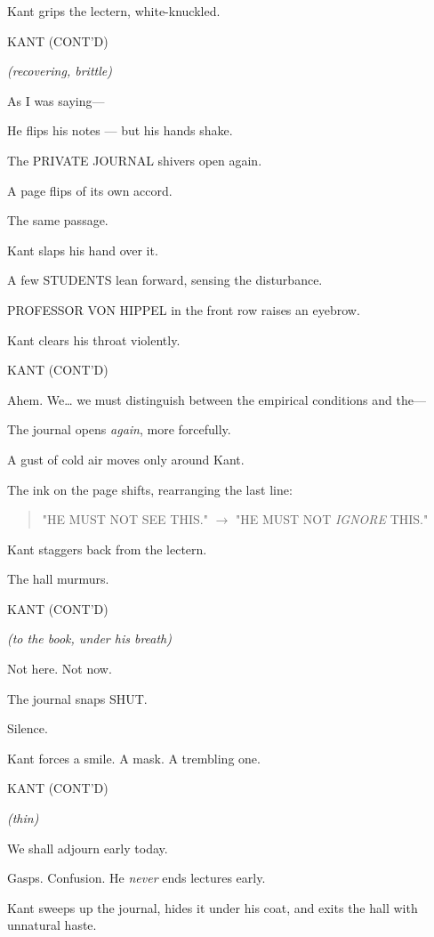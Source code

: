 \documentclass[12pt]{article}
\newenvironment{dialogue}[1]{%
  \vspace{0.8\baselineskip}%
  \noindent\hspace*{2.3in}\textsc{#1}\par%
  \noindent\hspace*{1.5in}\begin{minipage}[t]{4.5in}%
}{%
  \end{minipage}\par%
}
\newcommand{\paren}[1]{%
  \noindent\hspace*{1.8in}\textit{(#1)}\par%
}
\begin{document}
Kant grips the lectern, white-knuckled.

\begin{dialogue}{KANT (CONT'D)}
\paren{recovering, brittle}
As I was saying—
\end{dialogue}

He flips his notes — but his hands shake.

The PRIVATE JOURNAL shivers open again.

A page flips of its own accord.

The same passage.

Kant slaps his hand over it.

A few STUDENTS lean forward, sensing the disturbance.

PROFESSOR VON HIPPEL in the front row raises an eyebrow.

Kant clears his throat violently.

\begin{dialogue}{KANT (CONT'D)}
Ahem.
We… we must distinguish between the empirical conditions and the—
\end{dialogue}

The journal opens \emph{again}, more forcefully.

A gust of cold air moves only around Kant.

The ink on the page shifts, rearranging the last line:

\begin{quote}
"HE MUST NOT SEE THIS."
$\rightarrow$
"HE MUST NOT \emph{IGNORE} THIS."
\end{quote}

Kant staggers back from the lectern.

The hall murmurs.

\begin{dialogue}{KANT (CONT'D)}
\paren{to the book, under his breath}
Not here.
Not now.
\end{dialogue}

The journal snaps SHUT.

Silence.

Kant forces a smile.
A mask. A trembling one.

\begin{dialogue}{KANT (CONT'D)}
\paren{thin}
We shall adjourn early today.
\end{dialogue}

Gasps. Confusion. He \emph{never} ends lectures early.

Kant sweeps up the journal, hides it under his coat,
and exits the hall with unnatural haste.
\end{document}
